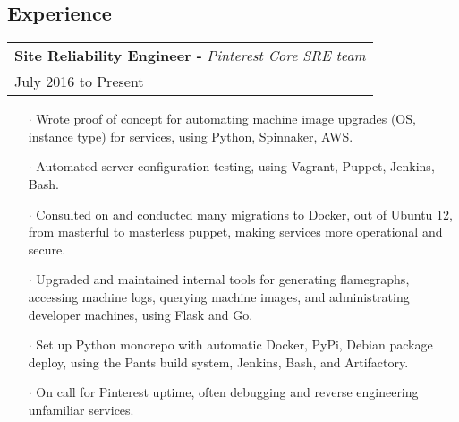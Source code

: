 \documentclass[letterpaper, oneside, final]{scrartcl} %
\begin{document}
\begin{center}

\section{Experience}

\renewcommand{\arraystretch}{1.3}
\begingroup\setlength{\fboxsep}{0pt}
\colorbox{mygray}{
\begin{flushleft}
\begin{tabularx}{\textwidth}{l}
\textbf{Site Reliability Engineer -} \textit{Pinterest Core SRE team}\\
July 2016 to Present\\
\end{tabularx}
\end{flushleft}
}\endgroup
\vspace{-0.1cm}
\begin{itemize} \itemsep-0.2cm
\item[$\cdot$] Wrote proof of concept for automating machine image upgrades (OS, instance type) for services, using Python, Spinnaker, AWS.\\
\item[$\cdot$] Automated server configuration testing, using Vagrant, Puppet, Jenkins, Bash.\\
\item[$\cdot$] Consulted on and conducted many migrations to Docker, out of Ubuntu 12, from masterful to masterless puppet, making services more operational and secure.\\
\item[$\cdot$] Upgraded and maintained internal tools for generating flamegraphs, accessing machine logs, querying machine images, and administrating developer machines, using Flask and Go.\\
\item[$\cdot$] Set up Python monorepo with automatic Docker, PyPi, Debian package deploy, using the Pants build system, Jenkins, Bash, and Artifactory.\\
\item[$\cdot$] On call for Pinterest uptime, often debugging and reverse engineering unfamiliar services.\\
\end{itemize}


\end{center}
\end{document}
